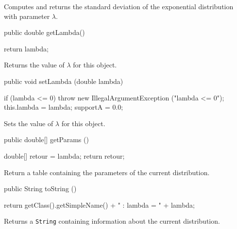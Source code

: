 \begin{tabb}  Computes and returns the standard deviation of the
   exponential distribution with parameter $\lambda$.
\end{tabb}
\begin{htmlonly}
\end{htmlonly}
\begin{code}

   public double getLambda()\begin{hide} {
      return lambda;
   }
\end{hide}
\end{code}
  \begin{tabb}
  Returns the value of $\lambda$ for this object.
 \end{tabb}
\begin{code}

   public void setLambda (double lambda)\begin{hide} {
      if (lambda <= 0)
         throw new IllegalArgumentException ("lambda <= 0");
      this.lambda = lambda;
      supportA = 0.0;
   }\end{hide}
\end{code}
  \begin{tabb}
  Sets the value of $\lambda$ for this object.
 \end{tabb}
\begin{code}

   public double[] getParams ()\begin{hide} {
      double[] retour = {lambda};
      return retour;
   }\end{hide}
\end{code}
\begin{tabb}
   Return a table containing the parameters of the current distribution.
\end{tabb}
\begin{hide}\begin{code}

   public String toString ()\begin{hide} {
      return getClass().getSimpleName() + " : lambda = " + lambda;
   }\end{hide}
\end{code}
\begin{tabb}
   Returns a \texttt{String} containing information about the current distribution.
\end{tabb}
\end{hide}

\begin{code}\begin{hide}
}\end{hide}
\end{code}

